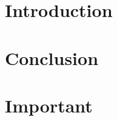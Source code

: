 \documentclass[a4paper,12pt,final]{book}
\begin{document}
 
    \frontmatter
    \tableofcontents
 
    \mainmatter
    \chapter{Introduction}
    \lipsum
 
    \chapter{Conclusion}
    \lipsum
 
    \backmatter
    \chapter{Important}
    \lipsum
 
\end{document}
